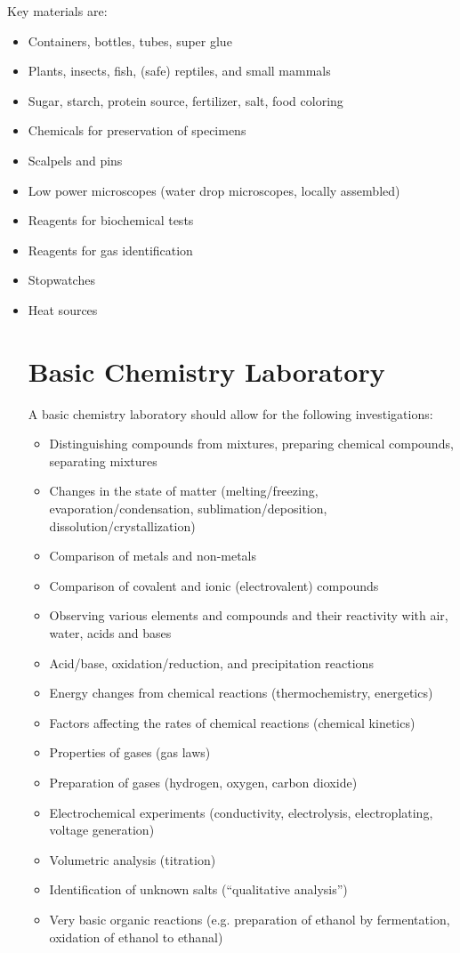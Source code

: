 Key materials are:
\begin{itemize}
\item{Containers, bottles, tubes, super glue}
\item{Plants, insects, fish, (safe) reptiles, and small mammals}
\item{Sugar, starch, protein source, fertilizer, salt, food coloring}
\item{Chemicals for preservation of specimens}
\item{Scalpels and pins}
\item{Low power microscopes (water drop microscopes, locally assembled)}
\item{Reagents for biochemical tests}
\item{Reagents for gas identification}
\item{Stopwatches}
\item{Heat sources}

\section{Basic Chemistry Laboratory}

A basic chemistry laboratory should allow for the following investigations:
\begin{itemize}
\item{Distinguishing compounds from mixtures, 
preparing chemical compounds, separating mixtures}
\item{Changes in the state of matter (melting/freezing, 
evaporation/condensation, sublimation/deposition, 
dissolution/crystallization)}
\item{Comparison of metals and non-metals}
\item{Comparison of covalent and ionic (electrovalent) compounds}
\item{Observing various elements and compounds 
and their reactivity with air, water, acids and bases}
\item{Acid/base, oxidation/reduction, and precipitation reactions}
\item{Energy changes from chemical reactions (thermochemistry, energetics)}
\item{Factors affecting the rates of chemical reactions (chemical kinetics)}
\item{Properties of gases (gas laws)}
\item{Preparation of gases (hydrogen, oxygen, carbon dioxide)}
\item{Electrochemical experiments 
(conductivity, electrolysis, electroplating, voltage generation)}
\item{Volumetric analysis (titration)}
\item{Identification of unknown salts (“qualitative analysis”)}
\item{Very basic organic reactions 
(e.g. preparation of ethanol by fermentation, 
oxidation of ethanol to ethanal)}
\end{itemize}


\end{itemize}
